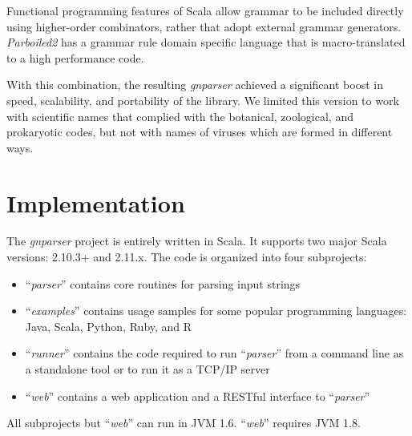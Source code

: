 \documentclass{bmcart}
\begin{document}
Functional programming features of Scala allow  grammar to be included directly 
using higher-order combinators, rather that adopt external grammar generators. \textit{Parboiled2} has a grammar rule domain
specific language that is macro-translated
\cite{Burmako:2013:SML:2489837.2489840} to a high performance code.


With this combination, the resulting \textit{gnparser} achieved a significant boost in speed, scalability, and portability of the library.  We limited this version to work with scientific names that complied with the botanical, zoological, and prokaryotic codes, but not with names of viruses which are formed in different ways.
\section*{Implementation}

The \textit{gnparser} project is entirely written in Scala. It supports two
major Scala versions: 2.10.3+ and 2.11.x. The code is organized into four
subprojects:

\begin{itemize}
  \item ``\textit{parser}'' contains core routines for parsing input strings
  \item ``\textit{examples}'' contains usage samples for some popular
  programming languages: Java, Scala, Python, Ruby, and R
  \item ``\textit{runner}'' contains the code required to run ``\textit{parser}''
  from a command line as a standalone tool or to run it as a TCP/IP server
  \item ``\textit{web}'' contains a web application and a RESTful interface to
  ``\textit{parser}''
\end{itemize}

All subprojects but ``\textit{web}'' can run in JVM 1.6. ``\textit{web}''
requires JVM 1.8.
\end{document}

